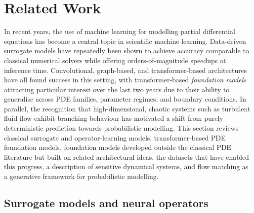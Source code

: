 \chapter{Related Work}
\label{ch:relatedwork}

In recent years, the use of machine learning for modelling partial differential equations has become a central topic in scientific machine learning. Data-driven surrogate models have repeatedly been shown to achieve accuracy comparable to classical numerical solvers while offering orders-of-magnitude speedups at inference time. Convolutional, graph-based, and transformer-based architectures have all found success in this setting, with transformer-based \textit{foundation models} attracting particular interest over the last two years due to their ability to generalise across PDE families, parameter regimes, and boundary conditions. In parallel, the recognition that high-dimensional, chaotic systems such as turbulent fluid flow exhibit branching behaviour has motivated a shift from purely deterministic prediction towards probabilistic modelling. This section reviews classical surrogate and operator-learning models, transformer-based PDE foundation models, foundation models developed outside the classical PDE literature but built on related architectural ideas, the datasets that have enabled this progress, a description of sensitive dynamical systems, and flow matching as a generative framework for probabilistic modelling.

\section{Surrogate models and neural operators} 

